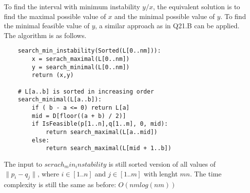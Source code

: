 \documentclass[12pt,a4paper]{article}
\newcommand{\question}[1]{\bigskip\noindent{\textbf{Q{#1} solution}}}
\begin{document}
\question{21.C}

To find the interval with minimum instability $y / x$, the equivalent solution is to find the maximal possible value of $x$ and the minimal possible value of $y$. To find the minimal feasible value of $y$, a similar approach as in Q21.B can be applied. The algorithm is as follows.

\begin{lstlisting}
	search_min_instability(Sorted(L[0..nm])):
		x = serach_maximal(L[0..nm])
		y = search_minimal(L[0..nm])
		return (x,y)
	
	# L[a..b] is sorted in increasing order
	search_minimal(L[a..b]):
		if ( b - a <= 0) return L[a]
		mid = D[floor((a + b) / 2)]
		if IsFeasible(p[1..n],q[1..m], 0, mid):
			return search_maximal(L[a..mid])
		else:
			return search_maximal(L[mid + 1..b])
\end{lstlisting}

The input to $serach_min_instability$ is still sorted version of all values of $\|p_i - q_j\|$, where $i \in [1..n]$ and $j \in [1..m]$ with lenght $mn$. The time complexity is still the same as before: $O(nmlog(nm))$
\end{document}
